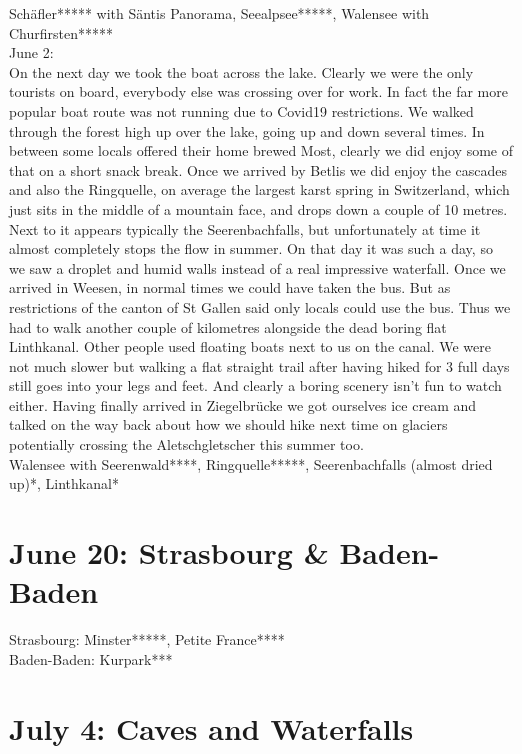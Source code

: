 Sch\"afler***** with S\"antis Panorama, Seealpsee*****, Walensee with Churfirsten*****\\

June 2:\\
On the next day we took the boat across the lake. Clearly we were the only tourists on board, everybody else was crossing over for work. In fact the far more popular boat route was not running due to Covid19 restrictions. We walked through the forest high up over the lake, going up and down several times. In between some locals offered their home brewed Most, clearly we did enjoy some of that on a short snack break. Once we arrived by Betlis we did enjoy the cascades and also the Ringquelle, on average the largest karst spring in Switzerland, which just sits in the middle of a mountain face, and drops down a couple of 10 metres. Next to it appears typically the Seerenbachfalls, but unfortunately at time it almost completely stops the flow in summer. On that day it was such a day, so we saw a droplet and humid walls instead of a real impressive waterfall. Once we arrived in Weesen, in normal times we could have taken the bus. But as restrictions of the canton of St Gallen said only locals could use the bus. Thus we had to walk another couple of kilometres alongside the dead boring flat Linthkanal. Other people used floating boats next to us on the canal. We were not much slower but walking a flat straight trail after having hiked for 3 full days still goes into your legs and feet. And clearly a boring scenery isn't fun to watch either. Having finally arrived in Ziegelbr\"ucke we got ourselves ice cream and talked on the way back about how we should hike next time on glaciers potentially crossing the Aletschgletscher this summer too.\\


Walensee with Seerenwald****, Ringquelle*****, Seerenbachfalls (almost dried up)*, Linthkanal*\\

 \section{June 20: Strasbourg \& Baden-Baden}
\label{2020:Strasbourg}

Strasbourg: Minster*****, Petite France****\\
Baden-Baden: Kurpark***\\

 \section{July 4: Caves and Waterfalls}
\label{2020:CavesWaterfalls}

